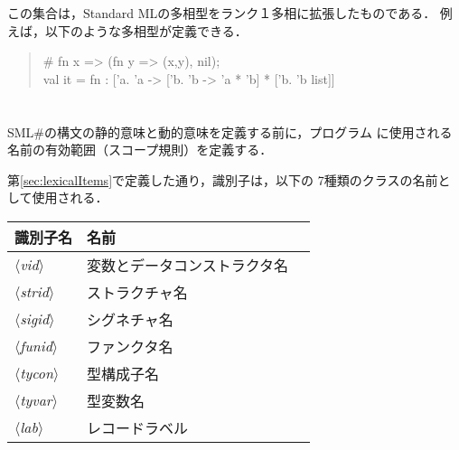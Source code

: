 \documentclass{jbook}
\newif\ifjp
\newcommand{\txt}[2]{#2}
\newcommand{\smlsharp}{SML\#}
\newcommand{\nonterm}[1]{\mbox{$\langle$}{\it #1}\mbox{$\rangle$}}
\newenvironment{program}{\begin{quote}\begin{tt}}%
                        {\end{tt}\end{quote}}
\begin{document}
	この集合は，Standard MLの多相型をランク１多相に拡張したものである．
	例えば，以下のような多相型が定義できる．
\begin{program}
\# fn x => (fn y => (x,y), nil);\\
val it = fn : ['a. 'a -> ['b. 'b -> 'a * 'b] * ['b. 'b list]]
\end{program}
\else%
\fi%

% 
\ifjp%
\else%
\fi%

\chapter{\txt{名前の種類とスコープ規則}{}}
\label{sce:scopeRule}

	\smlsharp{}の構文の静的意味と動的意味を定義する前に，プログラム
に使用される名前の有効範囲（スコープ規則）を定義する．

	第\ref{sec:lexicalItems}で定義した通り，識別子は，以下の
7種類のクラスの名前として使用される．

\begin{center}
\begin{tabular}{|l|l|l|}
\hline
識別子名 & 名前\\\hline
\nonterm{vid}   & 変数とデータコンストラクタ名\\
\nonterm{strid} & ストラクチャ名\\
\nonterm{sigid} & シグネチャ名\\
\nonterm{funid} & ファンクタ名\\
\nonterm{tycon} & 型構成子名 \\
\nonterm{tyvar} & 型変数名 \\
\nonterm{lab}   & レコードラベル\\
\hline
\end{tabular}
\end{center}
\end{document}
